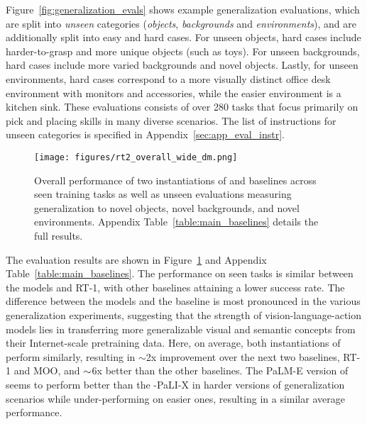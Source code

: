 Figure~\ref{fig:generalization_evals} shows example generalization evaluations, which are split into \textit{unseen} categories (\textit{objects}, \textit{backgrounds} and \textit{environments}), and are additionally split into easy and hard cases.
For unseen objects, hard cases include harder-to-grasp and more unique objects (such as toys).
For unseen backgrounds, hard cases include more varied backgrounds and novel objects.
Lastly, for unseen environments, hard cases correspond to a more visually distinct office desk environment with monitors and accessories, while the easier environment is a kitchen sink.
These evaluations consists of over 280 tasks that focus primarily on pick and placing skills in many diverse scenarios. 
The list of instructions for unseen categories is specified in Appendix~\ref{sec:app_eval_instr}.

\begin{figure}[h]
    \centering
    \texttt{[image: figures/rt2\_overall\_wide\_dm.png]}
\caption{Overall performance of two instantiations of \methodname and baselines across seen training tasks as well as unseen evaluations measuring generalization to novel objects, novel backgrounds, and novel environments. Appendix Table~\ref{table:main_baselines} details the full results.}
\label{fig:main_baselines}
\end{figure}

The evaluation results are shown in Figure~\ref{fig:main_baselines} and Appendix Table~\ref{table:main_baselines}. The performance on seen tasks is similar between the \methodname models and RT-1, with other baselines attaining a lower success rate. 
The difference between the \methodname models and the baseline is most pronounced in the various generalization experiments, suggesting that the strength of vision-language-action models lies in transferring more generalizable visual and semantic concepts from their Internet-scale pretraining data. Here, on average, both instantiations of \methodname perform similarly, resulting in $\sim$2x improvement over the next two baselines, RT-1 and MOO, and ${\scriptsize \sim}$6x better than the other baselines. The PaLM-E version of \methodname seems to perform better than the \methodname-PaLI-X in harder versions of generalization scenarios while under-performing on easier ones, resulting in a similar average performance.

